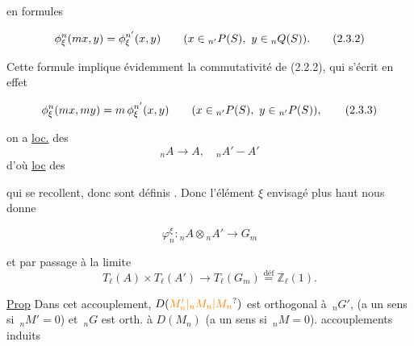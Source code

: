 
en formules

\[\phi_{\handwritten{\xi}}^n(mx,y)=\phi_{\handwritten{\xi}}^{n'}(x,y)\qquad(x\in{}_{n'}P(S),\ y\in{}_nQ(S)).\tag*{(2.3.2)}\]

Cette formule implique évidemment la commutativité de (2.2.2), qui s'écrit en effet

\[\phi_{\handwritten{\xi}}^n(mx,my)=m\,\phi_{\handwritten{\xi}}^{n'}(x,y)\qquad(x\handwritten{\in}{}_{n'}P(S),\ y\handwritten{\in}{}_{n'}P(S)),\tag*{\handwritten{(2.3.3)}}\]
\endgroup



on a \uline{loc.} des 
\[{}_nA\longrightarrow A,\quad {}_nA'\mathbin{-}A'\]
d'où \uline{loc} des 


qui se recollent, donc sont définis . Donc l'élément $\xi$ envisagé plus haut nous donne

\[\varphi_n^\xi:{}_nA\otimes{}_nA'\longrightarrow G_m\]

et par passage à la limite
\[T_\ell(A)\times T_\ell(A')\longrightarrow T_\ell(G_m)\overset{\text{déf}}{=}\mathbb Z_\ell(1).\]

\uline{Prop} Dans cet accouplement, $D(\unsure{M'_n|{}_nM_n|M_n})$ est orthogonal à $\,{}_nG'$,  (a un sens si $\,{}_nM'=0$) et  $\,{}_nG$ est orth. à $D(M_n)$ (a un sens si $\,{}_nM=0$).  accouplements induits 

